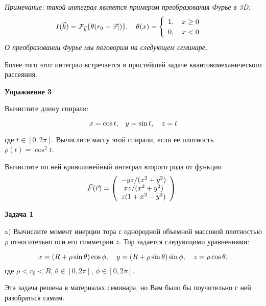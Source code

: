 \documentclass[a4paper,12pt]{article}
\begin{document}
\noindent \textit{Примечание: такой интеграл является примером преобразования Фурье в 3D:}
\begin{equation}\notag
I(\vec{k})	=\mathcal{F}_{\vec{k}}\{\theta(r_{0}-|\vec{r}|)\},\quad\theta(x)=\begin{cases}
\begin{array}{c}
1,\quad x\geq0\\
0,\quad x<0
\end{array}\end{cases}
\end{equation}
\noindent \textit{О преобразовании Фурье мы поговорим на следующем семинаре.}

\noindent Более того этот интеграл встречается в простейшей задаче квантовомеханического рассеяния.

\vspace{15pt}
\noindent \textbf{Упражнение 3}

\noindent Вычислите длину спирали:

\begin{equation}
x=\cos t\text{,}\quad y=\sin t,\quad z=t
\notag
\end{equation}	

\noindent где $t\in[0,2\pi]$. Вычислите массу этой спирали, если ее плотность $\rho(t)=\cos^{2}t$.

\noindent Вычислите по ней криволинейный интеграл второго рода от функции
\begin{equation} \notag
\vec{F}(\vec{r})	=\left(\begin{array}{c}
-yz/(x^{2}+y^{2})\\
xz/(x^{2}+y^{2})\\
z(1+x^{2}-y^{2})
\end{array}\right).
\end{equation}

\vspace{15pt}
\noindent \textbf{Задача 1}

\noindent a) Вычислите момент инерции тора с однородной объемной массовой плотностью $\rho$ относительно оси его симметрии $z$. Тор задается следующими уравнениями:

\begin{equation}\notag
x	=(R+\rho\sin\theta)\cos\phi,\quad y=(R+\rho\sin\theta)\sin\phi,\quad z=\rho\cos\theta,
\end{equation}
\noindent где $\rho<r_{0}<R$, $\theta\in[0,2\pi]$, $\phi\in[0,2\pi]$.

\noindent Эта задача решена в материалах семинара, но Вам было бы поучительно с ней разобраться самим.
\end{document}
